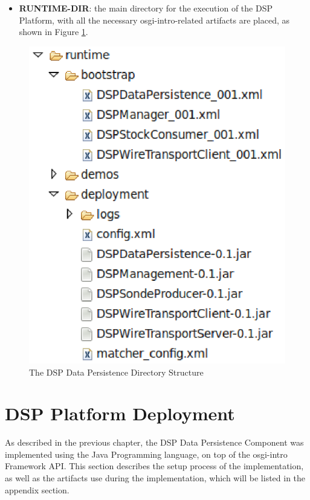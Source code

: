 \begin{itemize}
  \item \textbf{RUNTIME-DIR}: the main directory for the execution of the DSP
Platform, with all the necessary osgi-intro-related artifacts are placed, as shown in
Figure \ref{fig:dsp-runtime-dir}.
\end{itemize}

\begin{figure}[!t]
  \centering
  \includegraphics[scale=0.5]{../diagrams/dsp-runtime-dir}
  \caption{The DSP Data Persistence Directory Structure}
  \label{fig:dsp-runtime-dir}
\end{figure}

\section{DSP Platform Deployment}

As described in the previous chapter, the DSP Data Persistence Component was
implemented using the Java Programming language, on top of the osgi-intro Framework
API. This section describes the setup process of the implementation, as well as
the artifacts use during the implementation, which will be listed in the
appendix section.

